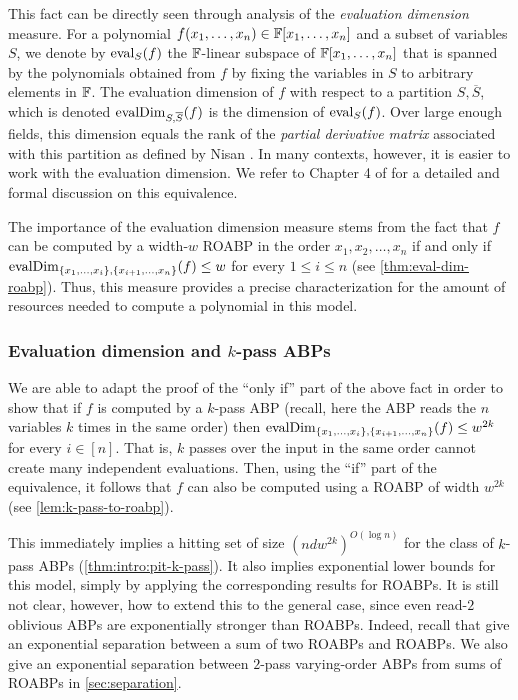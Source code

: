\documentclass[11pt]{article}
\begin{document}
This fact can be directly seen through analysis of the {\em evaluation dimension} measure.
For a polynomial $f(x_1, \ldots, x_n) \in \F[x_1, \ldots, x_n]$ and a subset of variables $S$, we denote by $\operatorname{eval}_S(f)$ the $\F$-linear subspace of $\F[x_1, \ldots, x_n]$ that is spanned by the polynomials obtained from $f$ by fixing the variables in $S$ to arbitrary elements in $\F$.
The evaluation dimension of $f$ with respect to a partition $S, \overline{S}$, which is denoted $\operatorname{evalDim}_{S, \overline{S}}(f)$ is the dimension of $\operatorname{eval}_S(f)$.
Over large enough fields, this dimension equals the rank of the {\em partial derivative matrix} associated with this partition as defined by Nisan \cite{nis91}.
In many contexts, however, it is easier to work with the evaluation dimension.
We refer to Chapter 4 of \cite{forbesphdthesis} for a detailed and formal discussion on this equivalence.


The importance of the evaluation dimension measure stems from the fact that $f$ can be computed by a width-$w$ ROABP in the order $x_1, x_2, \ldots, x_n$ if and only if $\operatorname{evalDim}_{\left\{ x_1, \ldots, x_i \right\}, \left\{ x_{i+1}, \ldots, x_n \right\}}(f) \le w$ for every $1 \le i \le n$ (see \autoref{thm:eval-dim-roabp}).
Thus, this measure provides a precise characterization for the amount of resources needed to compute a polynomial in this model.

\subsubsection{Evaluation dimension and $k$-pass ABPs}

We are able to adapt the proof of the ``only if'' part of the above fact in order to show that if $f$ is computed by a $k$-pass ABP (recall, here the ABP reads the $n$ variables $k$ times in the same order) then $\operatorname{evalDim}_{\left\{ x_1, \ldots, x_i \right\}, \left\{ x_{i+1}, \ldots, x_n \right\}}(f) \le w^{2k}$ for every $i \in [n]$.
That is, $k$ passes over the input in the same order cannot create many independent evaluations.
Then, using the ``if'' part of the equivalence, it follows that $f$ can also be computed using a ROABP of width $w^{2k}$ (see \autoref{lem:k-pass-to-roabp}).

This immediately implies a hitting set of size $(ndw^{2k})^{O(\log n)}$ for the class of $k$-pass ABPs (\autoref{thm:intro:pit-k-pass}).  It also implies exponential lower bounds for this model, simply by applying the corresponding results for ROABPs.
It is still not clear, however, how to extend this to the general case, since even read-$2$ oblivious ABPs are exponentially stronger than ROABPs.  Indeed, recall that \cite{KNS15} give an exponential separation between a sum of two ROABPs and ROABPs.  We also give an exponential separation between $2$-pass varying-order ABPs from sums of ROABPs in \autoref{sec:separation}.
\end{document}
